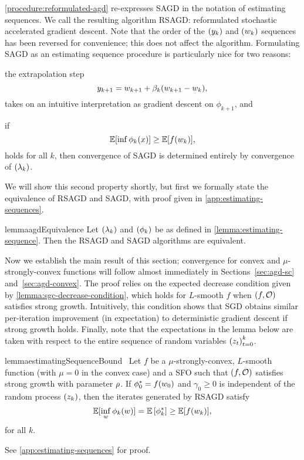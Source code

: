\autoref{procedure:reformulated-agd} re-expresses \ac{SAGD} in the notation of estimating sequences.
We call the resulting algorithm \acs{RSAGD}: reformulated stochastic accelerated gradient descent.
Note that the order of the \( \seq{\yk} \) and \( \seq{\wk} \) sequences has been reversed for convenience; this does not affect the algorithm.
Formulating \ac{SAGD} as an estimating sequence procedure is particularly nice for two reasons:
\begin{inparaenum}[(1)]
\item the extrapolation step \[ \ykk = \wkk + \beta_k (\wkk - \wk), \] takes on an intuitive interpretation as gradient descent on \( \phi_{k+1} \), and 
\item if \[  \E [\inf \phi_k(x)] \geq \E [f(\wk)], \] holds for all \( k \), then convergence of \ac{SAGD} is determined entirely by convergence of \( \seq{\lambda_k} \).
\end{inparaenum}
We will show this second property shortly, but first we formally state the equivalence of \ac{RSAGD} and \ac{SAGD}, with proof given in \autoref{app:estimating-sequences}.

\begin{restatable}{lemma}{agdEquivalence}\label{lemma:agdEquivalence}
    Let \( \seq{\lambda_k} \) and \( \seq{\phi_k} \) be as defined in \autoref{lemma:estimating-sequence}.
    Then the \ac{RSAGD} and \ac{SAGD} algorithms are equivalent.
\end{restatable}

Now we establish the main result of this section; convergence for convex and \( \mu \)-strongly-convex functions will follow almost immediately in Sections~\ref{sec:agd-sc} and~\ref{sec:agd-convex}.
The proof relies on the expected decrease condition given by \autoref{lemma:sgc-decrease-condition}, which holds for \( L \)-smooth \( f \) when \( \rbr{f, \oracle{}} \) satisfies strong growth.
Intuitively, this condition shows that \ac{SGD} obtains similar per-iteration improvement (in expectation) to deterministic gradient descent if strong growth holds. 
Finally, note that the expectations in the lemma below are taken with respect to the entire sequence of random variables \( \seq{\z_t}_{t=0}^k \).

\begin{restatable}{lemma}{estimatingSequenceBound}~\label{lemma:estimating-sequence-bound}
    Let \( f \) be a \( \mu \)-strongly-convex, \( L \)-smooth function (with \( \mu = 0 \) in the convex case) and \oracle{} a \ac{SFO} such that \( \rbr{f, \oracle{}} \) satisfies strong growth with parameter \( \sgc \).
    If \( \phi_0^* = f(\w_0) \) and \( \gamma_0 \geq 0 \) is independent of the random process \( \seq{\zk} \), then the iterates generated by \ac{RSAGD} satisfy 
    \[ \E [\inf_{w} \phi_k(\w)] = \E \sbr{\phi_k^*} \geq \E [f(\wk)], \]
    for all \( k \).
\end{restatable}
\noindent See \autoref{app:estimating-sequences} for proof.

